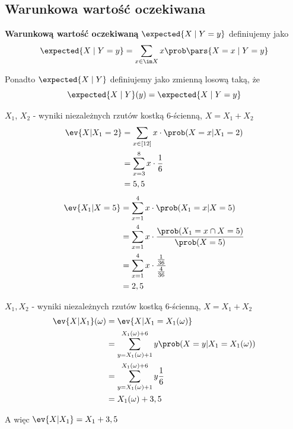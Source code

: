 \subsection{Warunkowa wartość oczekiwana}
\begin{definition}
	\textbf{Warunkową wartość oczekiwaną} \( \expected{X \mid Y = y} \) definiujemy jako
	\[
		\expected{X \mid Y = y} = \sum_{x \in \im X} x \prob\pars{X = x \mid Y = y}
	\]

	Ponadto \( \expected{X \mid Y} \) definiujemy jako zmienną losową taką, że
	\[
		\expected{X \mid Y}(y) = \expected{X \mid Y = y}
	\]
\end{definition}

\begin{example}
    \(X_1\), \(X_2\) - wyniki niezależnych rzutów kostką 6-ścienną, \(X = X_1 + X_2\)
    \begin{align*}
        \ev{X|X_1 = 2} &= \sum_{x \in [12]} x \cdot \prob(X = x|X_1 = 2) \\
        &= \sum_{x=3}^{8} x \cdot \frac{1}{6} \\
        &= 5,5
    \end{align*}
    \begin{align*}
        \ev{X_1|X = 5} &= \sum_{x=1}^{4} x \cdot \prob(X_1 = x | X = 5) \\
        &= \sum_{x=1}^{4} x \cdot \frac{\prob(X_1 = x \cap X = 5)}{\prob(X = 5)} \\
        &= \sum_{x=1}^{4} x \cdot \frac{\frac{1}{36}}{\frac{4}{36}} \\
        &= 2,5
    \end{align*}
\end{example}

\begin{example}
    \(X_1, X_2\) - wyniki niezależnych rzutów kostką 6-ścienną, \(X = X_1 + X_2\)
    \begin{align*}
        \ev{X | X_1}(\omega) &= \ev{X | X_1 = X_1(\omega)} \\
        &= \sum_{y = X_1(\omega)+1}^{X_1(\omega)+6} y \prob(X = y | X_1 = X_1(\omega)) \\
        &= \sum_{y = X_1(\omega)+1}^{X_1(\omega)+6} y \frac{1}{6} \\
        &= X_1(\omega) + 3,5
    \end{align*}

    A więc \(\ev{X | X_1} = X_1 + 3,5\)
\end{example}

